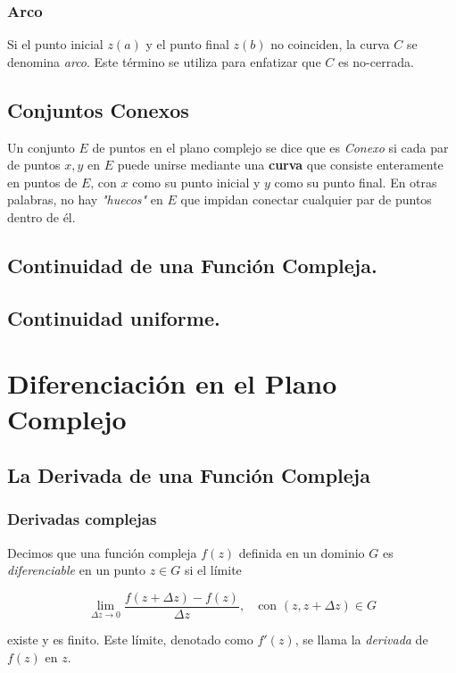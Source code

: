 \documentclass[10pt,a4paper]{book}
\begin{document}
\subsection{Arco} 
Si el punto inicial \( z(a) \) y el punto final \( z(b) \) no coinciden, la curva \( C \) se denomina \textit{arco}. Este término se utiliza para enfatizar que $C$ es no-cerrada.

\section{Conjuntos Conexos}
Un conjunto \( E \) de puntos en el plano complejo se dice que es \textit{Conexo} si cada par de puntos \( x, y \) en \( E \) puede unirse mediante una \textbf{curva} que consiste enteramente en puntos de \( E \), con \( x \) como su punto inicial y \( y \) como su punto final. En otras palabras, no hay \textit{"huecos"} en \( E \) que impidan conectar cualquier par de puntos dentro de él.

\section{Continuidad de una Función Compleja.}
\section{Continuidad uniforme.}
\chapter{Diferenciación en el Plano Complejo}
\section{La Derivada de una Función Compleja}

\subsection{Derivadas complejas}

Decimos que una función compleja $f(z)$ definida en un dominio $G$ es \textit{diferenciable} en un punto $z\in G$ si el límite

\begin{equation}
    \lim_{\Delta z \to 0} \frac{f(z + \Delta z) - f(z)}{\Delta z}, \quad \text{con } (z, z + \Delta z) \in G
\end{equation}

existe y es finito. Este límite, denotado como $f'(z)$, se llama la \textit{derivada} de $f(z)$ en $z$.
\end{document}

